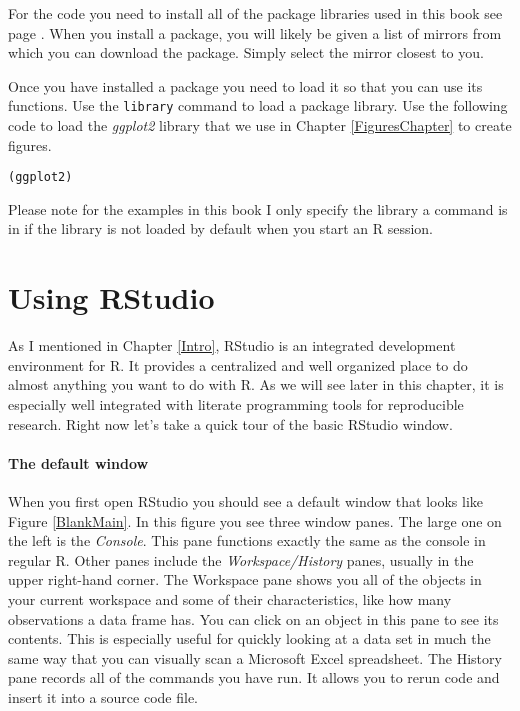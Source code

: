 For the code you need to install all of the package libraries used in this book see page \pageref{ReqPackages}. When you install a package, you will likely be given a list of mirrors from which you can download the package. Simply select the mirror closest to you.

Once you have installed a package you need to load it so that you can use its functions. Use the \texttt{library} command to load a package library. Use the following code to load the {\emph{ggplot2}} library that we use in Chapter \ref{FiguresChapter} to create figures.

\begin{knitrout}
\color{fgcolor}\begin{kframe}
\begin{alltt}
(ggplot2)
\end{alltt}
\end{kframe}
\end{knitrout}


\noindent Please note for the examples in this book I only specify the library a command is in if the library is not loaded by default when you start an R session. 

\section{Using RStudio}

As I mentioned in Chapter \ref{Intro}, RStudio is an integrated development environment for R. It provides a centralized and well organized place to do almost anything you want to do with R. As we will see later in this chapter, it is especially well integrated with literate programming tools for reproducible research. Right now let's take a quick tour of the basic RStudio window.

\paragraph{The default window}

When you first open RStudio you should see a default window that looks like Figure \ref{BlankMain}. In this figure you see three window panes. The large one on the left is the {\emph{Console}}. This pane functions exactly the same as the console in regular R. Other panes include the {\emph{Workspace/History}} panes, usually in the upper right-hand corner. The Workspace pane shows you all of the objects in your current workspace and some of their characteristics, like how many observations a data frame has. You can click on an object in this pane to see its contents. This is especially useful for quickly looking at a data set in much the same way that you can visually scan a Microsoft Excel spreadsheet. The History pane records all of the commands you have run. It allows you to rerun code and insert it into a source code file.

